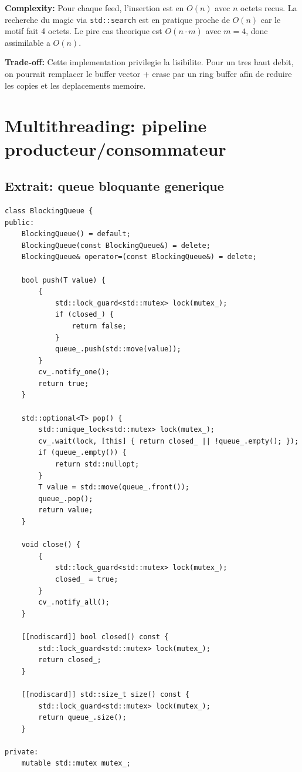 \documentclass[10pt,a4paper]{article}
\newcommand{\complexity}[1]{\textbf{Complexity:} #1}
\newcommand{\tradeoff}[1]{\textbf{Trade-off:} #1}
\begin{document}
\complexity{Pour chaque feed, l'insertion est en $O(n)$ avec $n$ octets recus. La recherche du magic via \texttt{std::search} est en pratique proche de $O(n)$ car le motif fait 4 octets. Le pire cas theorique est $O(n \cdot m)$ avec $m=4$, donc assimilable a $O(n)$.}

\tradeoff{Cette implementation privilegie la lisibilite. Pour un tres haut debit, on pourrait remplacer le buffer vector + erase par un ring buffer afin de reduire les copies et les deplacements memoire.}

\section{Multithreading: pipeline producteur/consommateur}

\subsection{Extrait: queue bloquante generique}
\begin{lstlisting}[caption={Queue thread-safe avec fermeture explicite}]
class BlockingQueue {
public:
    BlockingQueue() = default;
    BlockingQueue(const BlockingQueue&) = delete;
    BlockingQueue& operator=(const BlockingQueue&) = delete;

    bool push(T value) {
        {
            std::lock_guard<std::mutex> lock(mutex_);
            if (closed_) {
                return false;
            }
            queue_.push(std::move(value));
        }
        cv_.notify_one();
        return true;
    }

    std::optional<T> pop() {
        std::unique_lock<std::mutex> lock(mutex_);
        cv_.wait(lock, [this] { return closed_ || !queue_.empty(); });
        if (queue_.empty()) {
            return std::nullopt;
        }
        T value = std::move(queue_.front());
        queue_.pop();
        return value;
    }

    void close() {
        {
            std::lock_guard<std::mutex> lock(mutex_);
            closed_ = true;
        }
        cv_.notify_all();
    }

    [[nodiscard]] bool closed() const {
        std::lock_guard<std::mutex> lock(mutex_);
        return closed_;
    }

    [[nodiscard]] std::size_t size() const {
        std::lock_guard<std::mutex> lock(mutex_);
        return queue_.size();
    }

private:
    mutable std::mutex mutex_;
\end{lstlisting}
\end{document}
